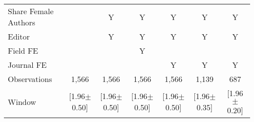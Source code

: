 \begin{tabular}{l*{6}{c}}
Share Female Authors &         &        Y&        Y&        Y&        Y&        Y\\
Editor          &         &        Y&        Y&        Y&        Y&        Y\\
Field FE        &         &         &        Y&         &         &         \\
Journal FE      &         &         &         &        Y&        Y&        Y\\
\hline
Observations    &    1,566&    1,566&    1,566&    1,566&    1,139&      687\\
Window          &[1.96$\pm$0.50]&[1.96$\pm$0.50]&[1.96$\pm$0.50]&[1.96$\pm$0.50]&[1.96$\pm$0.35]&[1.96$\pm$0.20]\\
\hline\hline
\end{tabular}
